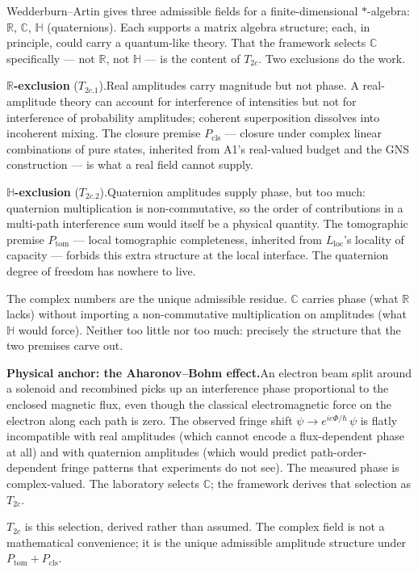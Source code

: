 \documentclass[11pt]{article}
\theoremstyle{remark}
\begin{document}
\begin{tcolorbox}[apfbox, title={Why exactly $\mathbb{C}$: the narrow selection by $T_{2c}$}]
Wedderburn--Artin gives three admissible fields for a finite-dimensional $*$-algebra: $\mathbb{R}$, $\mathbb{C}$, $\mathbb{H}$ (quaternions).  Each supports a matrix algebra structure; each, in principle, could carry a quantum-like theory.  That the framework selects $\mathbb{C}$ specifically --- not $\mathbb{R}$, not $\mathbb{H}$ --- is the content of $T_{2c}$.  Two exclusions do the work.

\smallskip\noindent\textbf{$\mathbb{R}$-exclusion} ($T_{2c.1}$).\quad Real amplitudes carry magnitude but not phase.  A real-amplitude theory can account for interference of intensities but not for interference of probability amplitudes; coherent superposition dissolves into incoherent mixing.  The closure premise $P_{\mathrm{cls}}$ --- closure under complex linear combinations of pure states, inherited from A1's real-valued budget and the GNS construction --- is what a real field cannot supply.

\smallskip\noindent\textbf{$\mathbb{H}$-exclusion} ($T_{2c.2}$).\quad Quaternion amplitudes supply phase, but too much: quaternion multiplication is non-commutative, so the order of contributions in a multi-path interference sum would itself be a physical quantity.  The tomographic premise $P_{\mathrm{tom}}$ --- local tomographic completeness, inherited from $L_{\mathrm{loc}}$'s locality of capacity --- forbids this extra structure at the local interface.  The quaternion degree of freedom has nowhere to live.

\smallskip\noindent The complex numbers are the unique admissible residue.  $\mathbb{C}$ carries phase (what $\mathbb{R}$ lacks) without importing a non-commutative multiplication on amplitudes (what $\mathbb{H}$ would force).  Neither too little nor too much: precisely the structure that the two premises carve out.

\smallskip\noindent\textbf{Physical anchor: the Aharonov--Bohm effect.}\quad An electron beam split around a solenoid and recombined picks up an interference phase proportional to the enclosed magnetic flux, even though the classical electromagnetic force on the electron along each path is zero.  The observed fringe shift $\psi \to e^{ie\Phi/\hbar}\,\psi$ is flatly incompatible with real amplitudes (which cannot encode a flux-dependent phase at all) and with quaternion amplitudes (which would predict path-order-dependent fringe patterns that experiments do not see).  The measured phase is complex-valued.  The laboratory selects $\mathbb{C}$; the framework derives that selection as $T_{2c}$.

\smallskip\noindent $T_{2c}$ is this selection, derived rather than assumed.  The complex field is not a mathematical convenience; it is the unique admissible amplitude structure under $P_{\mathrm{tom}} + P_{\mathrm{cls}}$.
\end{tcolorbox}
\end{document}
